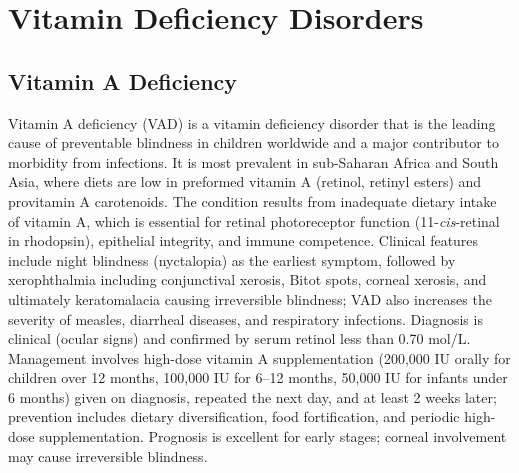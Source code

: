 \section{Vitamin Deficiency Disorders}








\label{sec:Vitamin Deficiency Disorders}

\subsection{Vitamin A Deficiency}
\label{sec:Vitamin A Deficiency}
Vitamin A deficiency (VAD) is a vitamin deficiency disorder that is the leading cause of preventable blindness in children worldwide and a major contributor to morbidity from infections. It is most prevalent in sub-Saharan Africa and South Asia, where diets are low in preformed vitamin A (retinol, retinyl esters) and provitamin A carotenoids. The condition results from inadequate dietary intake of vitamin A, which is essential for retinal photoreceptor function (11-\emph{cis}-retinal in rhodopsin), epithelial integrity, and immune competence. Clinical features include night blindness (nyctalopia) as the earliest symptom, followed by xerophthalmia including conjunctival xerosis, Bitot spots, corneal xerosis, and ultimately keratomalacia causing irreversible blindness; VAD also increases the severity of measles, diarrheal diseases, and respiratory infections. Diagnosis is clinical (ocular signs) and confirmed by serum retinol less than 0.70 \textmu mol/L. Management involves high-dose vitamin A supplementation (200,000 IU orally for children over 12 months, 100,000 IU for 6--12 months, 50,000 IU for infants under 6 months) given on diagnosis, repeated the next day, and at least 2 weeks later; prevention includes dietary diversification, food fortification, and periodic high-dose supplementation. Prognosis is excellent for early stages; corneal involvement may cause irreversible blindness.

